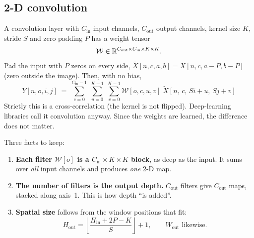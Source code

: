 \subsection{2-D convolution}
\label{sec:conv}

\begin{idea}
A convolution layer with $C_\text{in}$ input channels, $C_\text{out}$ output channels, kernel size $K$, stride $S$ and zero padding $P$ has a weight tensor
\[
  \mathcal W \in \mathbb{R}^{C_\text{out}\times C_\text{in}\times K\times K}.
\]
Pad the input with $P$ zeros on every side, $\tilde X[n,c,a,b] = X[n,c,a-P,b-P]$ (zero outside the image). Then, with no bias,
\[
  \boxed{\;Y[n,o,i,j] \;=\; \sum_{c=0}^{C_\text{in}-1}\;\sum_{u=0}^{K-1}\;\sum_{v=0}^{K-1}
  \mathcal W[o,c,u,v]\;\tilde X[n,\,c,\,S i+u,\,S j+v]\;}
\]
Strictly this is a cross-correlation (the kernel is not flipped). Deep-learning libraries call it convolution anyway. Since the weights are learned, the difference does not matter.

Three facts to keep:
\begin{enumerate}[nosep]
  \item \textbf{Each filter $\mathcal W[o]$ is a $C_\text{in}\times K\times K$ block}, as deep as the input. It sums over \emph{all} input channels and produces \emph{one} 2-D map.
  \item \textbf{The number of filters is the output depth.} $C_\text{out}$ filters give $C_\text{out}$ maps, stacked along axis~1. This is how depth ``is added''.
  \item \textbf{Spatial size} follows from the window positions that fit:
  \[
    H_\text{out} = \left\lfloor \frac{H_\text{in} + 2P - K}{S} \right\rfloor + 1, \qquad W_\text{out}\text{ likewise.}
  \]
\end{enumerate}
\end{idea}


